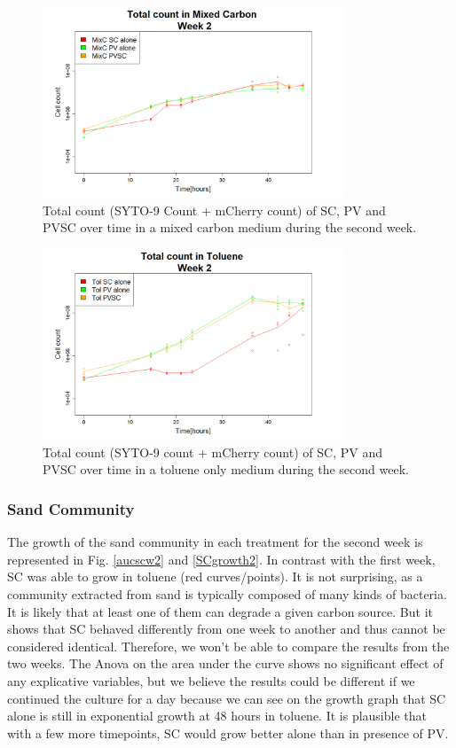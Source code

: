 \documentclass[a4paper, 10pt, conference]{ieeeconf}   %
\begin{document}
\begin{figure}[H]
	\centering
	\includegraphics[width=9cm]{totcount_mixC2.PNG}
	\caption{Total count (SYTO-9 Count + mCherry count) of SC, PV and PVSC over time in a mixed carbon medium during the second week.}
	\label{totcountmixC2text}
\end{figure}
\vspace{-0.4cm}
\begin{figure}[H]
	\centering
	\includegraphics[width=9cm]{totcount_tol2.PNG}
	\caption{Total count (SYTO-9 count + mCherry count) of SC, PV and PVSC over time in a toluene only medium during the second week.}
	\label{totcounttol2text}
\end{figure}
\subsubsection{Sand Community}
The growth of the sand community in each treatment for the second week is represented in Fig. \ref{aucscw2} and \ref{SCgrowth2}.
In contrast with the first week, SC was able to grow in toluene (red curves/points). It is not surprising, as a community extracted from sand is typically composed of many kinds of bacteria. It is likely that at least one of them can degrade a given carbon source. But it shows that SC behaved differently from one week to another and thus cannot be considered identical. Therefore, we won't be able to compare the results from the two weeks. 
The Anova on the area under the curve shows no significant effect of any explicative variables, but we believe the results could be different if we continued the culture for a day because we can see on the growth graph that SC alone is still in exponential growth at 48 hours in toluene. It is plausible that with a few more timepoints, SC would grow better alone than in presence of PV.\newline
\end{document}
